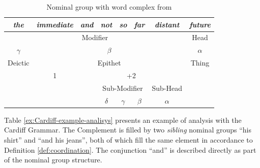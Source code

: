 \begin{table}[!ht]
    \centering
        \begin{tabular}{ccc|c|c|c|c|c}
            \hline
            \multicolumn{1}{|c|}{\textit{the}} & \multicolumn{1}{c|}{\textit{immediate}} & \textit{and}          & \textit{not} & \textit{so} & \textit{far} & \textit{distant}          & \multicolumn{1}{c|}{\textit{future}} \\ \hline
            \multicolumn{7}{|c|}{Modifier} & \multicolumn{1}{c|}{Head} \\ \hline
            \multicolumn{1}{|c|}{$\gamma$}            & \multicolumn{6}{c|}{$\beta$}                                                                                                                  & \multicolumn{1}{c|}{$\alpha$}               \\ \hline
            \multicolumn{1}{|c|}{Deictic}      & \multicolumn{6}{c|}{Epithet}                                                                                                            & \multicolumn{1}{c|}{Thing}           \\ \hline
            \multicolumn{1}{c|}{}              & \multicolumn{1}{c|}{1}                  & \multicolumn{5}{c|}{+2}                                                                       &                                      \\ \cline{2-7}
            \multicolumn{1}{l}{} & \multicolumn{1}{l}{} & \multicolumn{1}{l|}{} & \multicolumn{3}{c|}{Sub-Modifier} & Sub-Head & \multicolumn{1}{l}{} \\ \cline{4-7}
            &  &  & $\delta$ & $\gamma$ & $\beta$ & $\alpha$ &  \\ \cline{4-7}
        \end{tabular}%
    \caption{Nominal group with word complex from \citep[564]{Halliday2013}}
    \label{tab:sydney-coordination-ifg}
\end{table}


Table \ref{ex:Cardiff-example-analisys} presents an example of analysis with the Cardiff Grammar. The Complement is filled by two \textit{sibling} nominal groups ``his shirt'' and ``and his jeans'', both of which fill the same element in accordance to Definition \ref{def:coordination}. The conjunction ``and'' is described directly as part of the nominal group structure.


